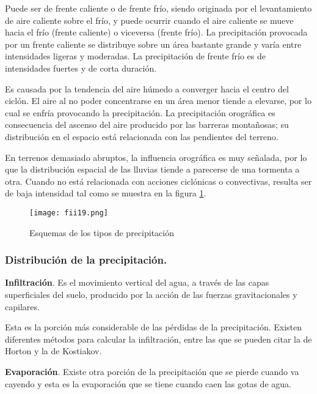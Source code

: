 \begin{definition}
	Puede ser de frente caliente o de frente frío,
	siendo originada por el levantamiento de aire caliente sobre el frío, y puede ocurrir
	cuando el aire caliente se mueve hacia el frío (frente caliente) o viceversa (frente frío).
	La precipitación provocada por un frente caliente se distribuye sobre un área bastante
	grande y varía entre intensidades ligeras y moderadas. La precipitación de frente frío es
	de intensidades fuertes y de corta duración.
\end{definition}

\begin{definition}
	Es causada por la tendencia del aire
	húmedo a converger hacia el centro del ciclón. El aire al no poder concentrarse en un
	área menor tiende a elevarse, por lo cual se enfría provocando la precipitación.
	La precipitación orográfica es consecuencia del ascenso del aire producido por
	las barreras montañosas; su distribución en el espacio está relacionada con las
	pendientes del terreno.
\end{definition}

En terrenos demasiado abruptos, la influencia orográfica es muy
señalada, por lo que la distribución espacial de las lluvias tiende a parecerse de una
tormenta a otra. Cuando no está relacionada con acciones ciclónicas o convectivas,
resulta ser de baja intensidad tal como se muestra en la figura \ref{fii19}.

\begin{figure}[h!]
	\centerline{\texttt{[image: fii19.png]}}
	\caption{Esquemas de los tipos de precipitación}
	\label{fii19}
\end{figure}

\subsubsection{Distribución de la precipitación.}

\textbf{Infiltración}. Es el movimiento vertical del agua, a través de las capas
superficiales del suelo, producido por la acción de las fuerzas gravitacionales y
capilares.

Esta es la porción más considerable de las pérdidas de la precipitación. Existen
diferentes métodos para calcular la infiltración, entre las que se pueden citar la de
Horton y la de Kostiakov.

\textbf{Evaporación}. Existe otra porción de la precipitación que se pierde cuando
va cayendo y esta es la evaporación que se tiene cuando caen las gotas de agua.

